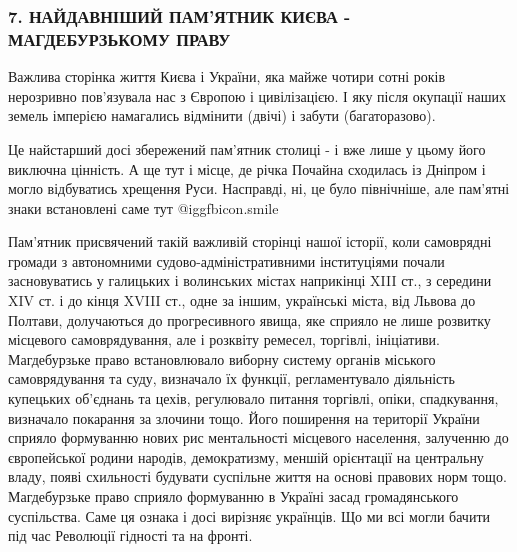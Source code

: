  
 
 
 
 

\subsubsection{7. НАЙДАВНІШИЙ ПАМ'ЯТНИК КИЄВА - МАГДЕБУРЗЬКОМУ ПРАВУ}

Важлива сторінка життя Києва і України, яка майже чотири сотні років нерозривно
пов’язувала нас з Європою і цивілізацією. І яку після окупації наших земель
імперією намагались відмінити (двічі) і забути (багаторазово). 


Це найстарший досі збережений пам’ятник столиці - і вже лише у цьому його
виключна цінність. А ще тут і місце, де річка Почайна сходилась із Дніпром і
могло відбуватись хрещення Руси. Насправді, ні, це було північніше, але
пам’ятні знаки встановлені саме тут  @igg{fbicon.smile}   

Пам’ятник присвячений такій важливій сторінці нашої історії, коли самоврядні
громади з автономними судово-адміністративними інституціями почали
засновуватись у галицьких і волинських містах наприкінці XIII ст., з середини
XIV ст. і до кінця XVIII ст., одне за іншим, українські міста, від Львова до
Полтави, долучаються до прогресивного явища, яке сприяло не лише розвитку
місцевого самоврядування, але і розквіту ремесел, торгівлі, ініціативи.
Магдебурзьке право встановлювало виборну систему органів міського
самоврядування та суду, визначало їх функції, регламентувало діяльність
купецьких об'єднань та цехів, регулювало питання торгівлі, опіки, спадкування,
визначало покарання за злочини тощо. Його поширення на території України
сприяло формуванню нових рис ментальності місцевого населення, залученню до
європейської родини народів, демократизму, меншій орієнтації на центральну
владу, появі схильності будувати суспільне життя на основі правових норм тощо.
Магдебурзьке право сприяло формуванню в Україні засад громадянського
суспільства. Саме ця ознака і досі вирізняє українців. Що ми всі могли бачити
під час Революції гідності та на фронті.

